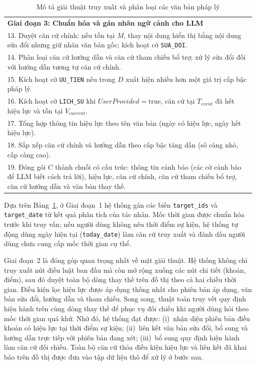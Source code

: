 \documentclass[../DoAn.tex]{subfiles}
\begin{document}
\begin{table}[H]
\begin{tabular}{|p{15cm}|}
\textbf{Giai đoạn 3: Chuẩn hóa và gán nhãn ngữ cảnh cho LLM} \\
13. Duyệt căn cứ chính: nếu tồn tại $M$, thay nội dung hiển thị bằng nội dung sửa đổi nhưng giữ nhãn văn bản gốc; kích hoạt cờ \texttt{SUA\_DOI}. \\
14. Phân loại căn cứ hướng dẫn và căn cứ tham chiếu bổ trợ; xử lý sửa đổi đối với hướng dẫn tương tự căn cứ chính. \\
15. Kích hoạt cờ \texttt{UU\_TIEN} nếu trong $D$ xuất hiện nhiều hơn một giá trị cấp bậc pháp lý. \\
16. Kích hoạt cờ \texttt{LICH\_SU} khi $UserProvided = \text{true}$, căn cứ tại $T_{event}$ đã hết hiệu lực và tồn tại $V_{current}$. \\
17. Tổng hợp thông tin hiệu lực theo tên văn bản (ngày có hiệu lực, ngày hết hiệu lực). \\
18. Sắp xếp căn cứ chính và hướng dẫn theo cấp bậc tăng dần (số càng nhỏ, cấp càng cao). \\
19. Đóng gói $C$ thành chuỗi có cấu trúc: thông tin cảnh báo (các cờ cảnh báo để LLM biết cách trả lời), hiệu lực, căn cứ chính, căn cứ tham chiếu bổ trợ, căn cứ hướng dẫn và văn bản thay thế. \\ \hline
\end{tabular}
\caption{Mô tả giải thuật truy xuất và phân loại các văn bản pháp lý}
\label{table:algo_temporal}
\end{table}

Dựa trên Bảng~\ref{table:algo_temporal}, ở Giai đoạn~1 hệ thống gán các biến \texttt{target\_ids} và \texttt{target\_date} từ kết quả phân tích của tác nhân. Mốc thời gian được chuẩn hóa trước khi truy vấn; nếu người dùng không nêu thời điểm sự kiện, hệ thống tự động dùng ngày hiện tại (\texttt{today\_date}) làm căn cứ truy xuất và đánh dấu người dùng chưa cung cấp mốc thời gian cụ thể.

Giai đoạn~2 là đóng góp quan trọng nhất về mặt giải thuật. Hệ thống không chỉ truy xuất nút điều luật ban đầu mà còn mở rộng xuống các nút chi tiết (khoản, điểm), sau đó duyệt toàn bộ dòng thay thế trên đồ thị theo cả hai chiều thời gian. Điều kiện lọc hiệu lực được áp dụng thống nhất cho phiên bản áp dụng, văn bản sửa đổi, hướng dẫn và tham chiếu. Song song, thuật toán truy vết quy định hiện hành trên cùng dòng thay thế để phục vụ đối chiếu khi người dùng hỏi theo mốc thời gian quá khứ. Nhờ đó, hệ thống đạt được: (i)~nhận diện phiên bản điều khoản có hiệu lực tại thời điểm sự kiện; (ii)~liên kết văn bản sửa đổi, bổ sung và hướng dẫn trực tiếp với phiên bản đang xét; (iii)~bổ sung quy định hiện hành làm căn cứ đối chiếu. Toàn bộ căn cứ thỏa điều kiện hiệu lực và liên kết đã khai báo trên đồ thị được đưa vào tập dữ liệu thô để xử lý ở bước sau.
\end{document}
